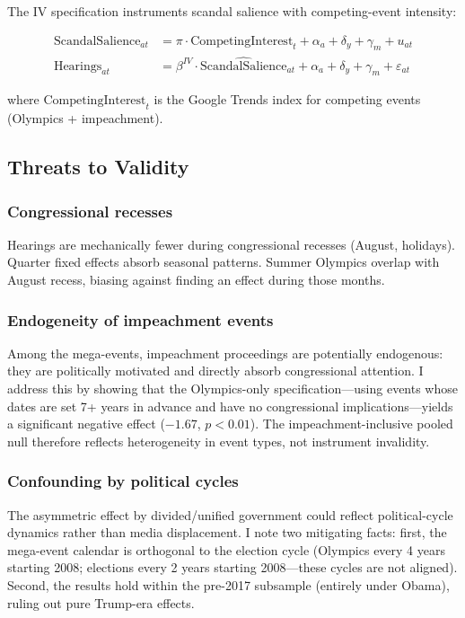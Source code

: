 \documentclass[12pt]{article}
\begin{document}
The IV specification instruments scandal salience with competing-event intensity:

\begin{align}
\text{ScandalSalience}_{at} &= \pi \cdot \text{CompetingInterest}_t + \alpha_a + \delta_y + \gamma_m + u_{at} \label{eq:fs} \\
\text{Hearings}_{at} &= \beta^{IV} \cdot \widehat{\text{ScandalSalience}}_{at} + \alpha_a + \delta_y + \gamma_m + \varepsilon_{at} \label{eq:ss}
\end{align}

\noindent where $\text{CompetingInterest}_t$ is the Google Trends index for competing events (Olympics + impeachment).

\subsection{Threats to Validity}

\subsubsection*{Congressional recesses} Hearings are mechanically fewer during congressional recesses (August, holidays). Quarter fixed effects absorb seasonal patterns. Summer Olympics overlap with August recess, biasing against finding an effect during those months.

\subsubsection*{Endogeneity of impeachment events} Among the mega-events, impeachment proceedings are potentially endogenous: they are politically motivated and directly absorb congressional attention. I address this by showing that the Olympics-only specification---using events whose dates are set 7+ years in advance and have no congressional implications---yields a significant negative effect ($-1.67$, $p < 0.01$). The impeachment-inclusive pooled null therefore reflects heterogeneity in event types, not instrument invalidity.

\subsubsection*{Confounding by political cycles} The asymmetric effect by divided/unified government could reflect political-cycle dynamics rather than media displacement. I note two mitigating facts: first, the mega-event calendar is orthogonal to the election cycle (Olympics every 4 years starting 2008; elections every 2 years starting 2008---these cycles are not aligned). Second, the results hold within the pre-2017 subsample (entirely under Obama), ruling out pure Trump-era effects.
\end{document}
